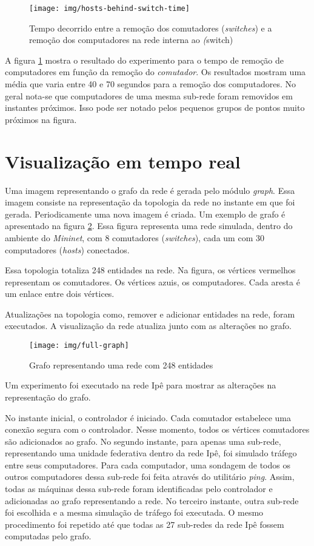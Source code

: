 \begin{figure}[h!]
    \centering
    \label{fig:hosts-behind-switch-time}
    \texttt{[image: img/hosts-behind-switch-time]}
    \caption{Tempo decorrido entre a remoção dos comutadores 
    (\emph{switches}) e a remoção dos computadores na rede interna ao 
    \emph(switch)}
\end{figure}

A figura \ref{fig:hosts-behind-switch-time} mostra o resultado do experimento
para o tempo de remoção de computadores em função da remoção do 
\emph{comutador}.
Os resultados mostram uma média que varia entre 40 e 70 segundos para a 
remoção dos computadores.
No geral nota-se que computadores de uma mesma sub-rede foram removidos em 
instantes próximos.
Isso pode ser notado pelos pequenos grupos de pontos muito próximos na 
figura.

\section{Visualização em tempo real}

Uma imagem representando o grafo da rede é gerada pelo módulo \emph{graph}.
Essa imagem consiste na representação da topologia da rede no instante 
em que foi gerada. 
Periodicamente uma nova imagem é criada.
Um exemplo de grafo é apresentado na figura \ref{fig:full-graph}.
Essa figura representa uma rede simulada, dentro do ambiente do 
\emph{Mininet}, com 8 comutadores (\emph{switches}), cada um com 30 
computadores (\emph{hosts}) conectados.

Essa topologia totaliza 248 entidades na rede.
Na figura, os vértices vermelhos representam os comutadores.
Os vértices azuis, os computadores.
Cada aresta é um enlace entre dois vértices.

Atualizações na topologia como, remover e adicionar entidades na rede, foram
executados.
A visualização da rede atualiza junto com as alterações no grafo.

\begin{figure}[h!]
    \centering
    \texttt{[image: img/full-graph]}
    \caption{Grafo representando uma rede com 248 entidades}
    \label{fig:full-graph}
\end{figure}
\break
Um experimento foi executado na rede Ipê para mostrar as alterações na 
representação do grafo.

No instante inicial, o controlador é iniciado.
Cada comutador estabelece uma conexão segura com o controlador.
Nesse momento, todos os vértices comutadores são adicionados ao grafo.
No segundo instante, para apenas uma sub-rede, representando uma unidade 
federativa dentro da rede Ipê, foi simulado tráfego entre seus computadores.
Para cada computador, uma sondagem de todos os outros computadores dessa
sub-rede foi feita através do utilitário \emph{ping}.
Assim, todas as máquinas dessa sub-rede foram identificadas pelo controlador
e adicionadas ao grafo representando a rede.
No terceiro instante, outra sub-rede foi escolhida e a mesma simulação de 
tráfego foi executada.
O mesmo procedimento foi repetido até que todas as 27 sub-redes da rede Ipê
fossem computadas pelo grafo.


